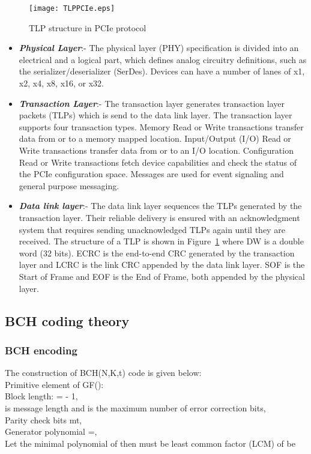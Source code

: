 \documentclass[10pt, conference, compsocconf]{IEEEtran}
\begin{document}
\begin{figure}[h]
\centering
\texttt{[image: TLPPCIe.eps]}
\vspace*{-8pt}
\caption{TLP structure in PCIe protocol}
\label{fig:TLPPCIe}
\end{figure}
\begin{itemize}
\item \textit{\textbf{Physical Layer}}:- The physical layer (PHY) specification is divided into an electrical and a logical part, which defines analog circuitry definitions, such as the serializer/deserializer (SerDes). Devices can have a number of lanes of x1, x2, x4, x8, x16, or x32.
\item \textit{\textbf{Transaction Layer}}:- 
The transaction layer generates transaction layer packets (TLPs) which is send to the data link layer. The transaction layer supports four transaction types. Memory Read or Write transactions transfer data from or to a memory mapped location. Input/Output (I/O) Read or Write transactions transfer data from or to an I/O location. Configuration Read or Write transactions fetch device capabilities and check the status of the PCIe configuration space. Messages are used for event signaling and general purpose messaging.
\item \textit{\textbf{ Data link layer}}:- 
The data link layer sequences the TLPs generated by the transaction layer. Their reliable delivery is ensured with an acknowledgment system that requires sending unacknowledged TLPs again until they are received. The structure of a TLP is shown in Figure~\ref{fig:TLPPCIe} where DW is a double word (32 bits). ECRC is the end-to-end CRC generated by the transaction layer and LCRC is the link CRC appended by the data link layer. SOF is the Start of Frame and EOF is the End of Frame, both appended by the physical layer.
\end{itemize}

\subsection{BCH coding theory} \label{BCH_Coding}
\subsubsection{BCH encoding}

The construction of BCH(N,K,t) code is given below:\\
Primitive element of GF():      \\
Block length:  =  - 1,\\
 is message length and  is the maximum number of error correction bits,\\
Parity check bits  mt,\\
Generator polynomial =, \\
Let  
 the minimal polynomial of   then  must be least common factor (LCM) of  be \\
\end{document}
